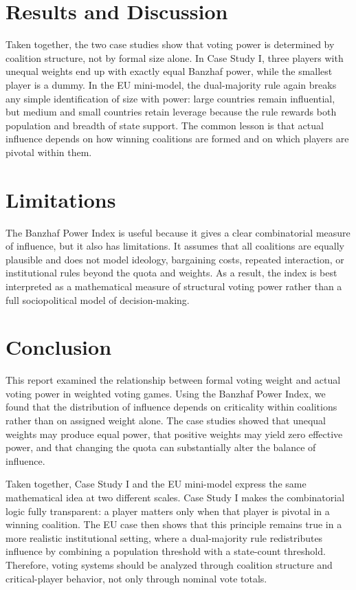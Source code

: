 \documentclass[lettersize,journal]{IEEEtran}
\begin{document}
\section{Results and Discussion}
Taken together, the two case studies show that voting power is determined by coalition structure, not by formal size alone. In Case Study I, three players with unequal weights end up with exactly equal Banzhaf power, while the smallest player is a dummy. In the EU mini-model, the dual-majority rule again breaks any simple identification of size with power: large countries remain influential, but medium and small countries retain leverage because the rule rewards both population and breadth of state support. The common lesson is that actual influence depends on how winning coalitions are formed and on which players are pivotal within them.

\section{Limitations}
The Banzhaf Power Index is useful because it gives a clear combinatorial measure of influence, but it also has limitations. It assumes that all coalitions are equally plausible and does not model ideology, bargaining costs, repeated interaction, or institutional rules beyond the quota and weights. As a result, the index is best interpreted as a mathematical measure of structural voting power rather than a full sociopolitical model of decision-making.

\section{Conclusion}
This report examined the relationship between formal voting weight and actual voting power in weighted voting games. Using the Banzhaf Power Index, we found that the distribution of influence depends on criticality within coalitions rather than on assigned weight alone. The case studies showed that unequal weights may produce equal power, that positive weights may yield zero effective power, and that changing the quota can substantially alter the balance of influence.

Taken together, Case Study I and the EU mini-model express the same mathematical idea at two different scales. Case Study I makes the combinatorial logic fully transparent: a player matters only when that player is pivotal in a winning coalition. The EU case then shows that this principle remains true in a more realistic institutional setting, where a dual-majority rule redistributes influence by combining a population threshold with a state-count threshold. Therefore, voting systems should be analyzed through coalition structure and critical-player behavior, not only through nominal vote totals.
\end{document}

